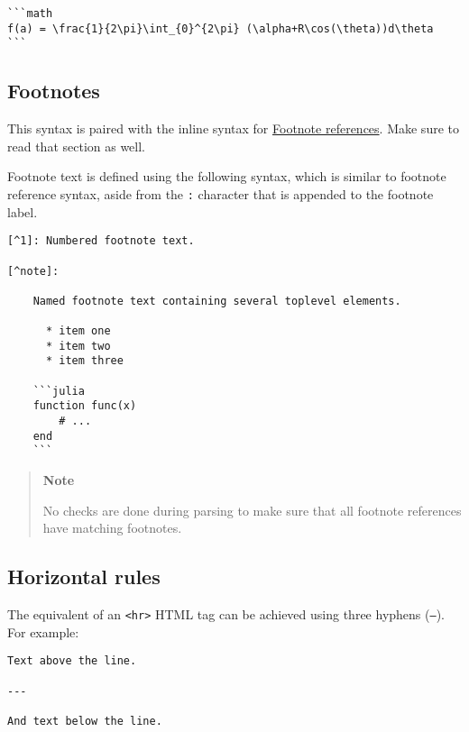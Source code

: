\begin{verbatim}
```math
f(a) = \frac{1}{2\pi}\int_{0}^{2\pi} (\alpha+R\cos(\theta))d\theta
```
\end{verbatim}



\hypertarget{1021238270223877775}{}


\subsection{Footnotes}



This syntax is paired with the inline syntax for \hyperlink{1545049731521220959}{Footnote references}. Make sure to read that section as well.



Footnote text is defined using the following syntax, which is similar to footnote reference syntax, aside from the \texttt{:} character that is appended to the footnote label.




\begin{lstlisting}
[^1]: Numbered footnote text.

[^note]:

    Named footnote text containing several toplevel elements.

      * item one
      * item two
      * item three

    ```julia
    function func(x)
        # ...
    end
    ```
\end{lstlisting}



\begin{quote}
\textbf{Note}

No checks are done during parsing to make sure that all footnote references have matching footnotes.

\end{quote}


\hypertarget{5663489325501471007}{}


\subsection{Horizontal rules}



The equivalent of an \texttt{<hr>} HTML tag can be achieved using three hyphens (\texttt{---}). For example:




\begin{lstlisting}
Text above the line.

---

And text below the line.
\end{lstlisting}



